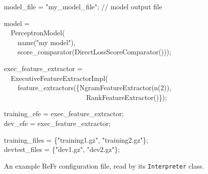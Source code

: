 \documentclass[a4paper]{article}
\newcommand\inlinecode[1]{\scriptsize\texttt{#1}\normalsize}
\let\textquotedbl="
\newenvironment{lyxcode}
{\par\begin{list}{}{
\scriptsize
\setlength{\leftmargin}{0.1in}
\setlength{\rightmargin}{\leftmargin}
\setlength{\listparindent}{0pt}%
\raggedright
\setlength{\itemsep}{0pt}
\setlength{\parsep}{0pt}
\normalfont\ttfamily}%
 \item[]}
{\end{list}}
\begin{document}

\begin{figure}
\begin{lyxcode}
\tiny
model\_file = \textquotedbl my\_model\_file\textquotedbl;  // model output file

model =\\
~~PerceptronModel(\\
~~~~name(\textquotedbl my model\textquotedbl),\\
~~~~score\_comparator(DirectLossScoreComparator()));

exec\_feature\_extractor =\\
~~ExecutiveFeatureExtractorImpl(\\
~~~~feature\_extractors(\{NgramFeatureExtractor(n(2)),\\
~~~~~~~~~~~~~~~~~~~~~~~~RankFeatureExtractor()\});

training\_efe = exec\_feature\_extractor;\\
dev\_efe = exec\_feature\_extractor;

training\_files = \{\textquotedbl training1.gz\textquotedbl,
\textquotedbl training2.gz\textquotedbl\};\\
devtest\_files = \{\textquotedbl dev1.gz\textquotedbl,
\textquotedbl dev2.gz\textquotedbl\};
\normalsize
\end{lyxcode}
\vspace{-0.2in}
\caption{\label{fig:interpreter-config}An example ReFr configuration file, read by its \inlinecode{Interpreter} class.}
\end{figure}
\end{document}
